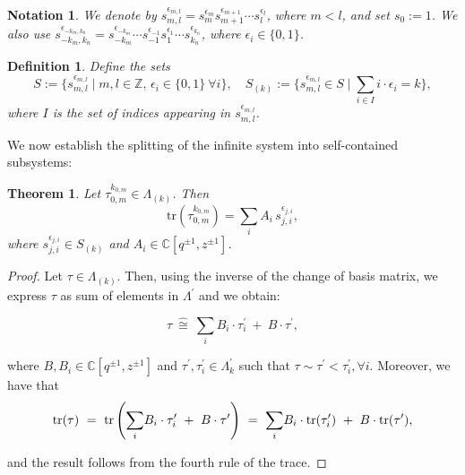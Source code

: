 \documentclass[11pt]{amsart}
\newtheorem{thm}{Theorem}
\newtheorem{defn}{Definition}
\newtheorem{nt}{Notation}
\begin{document}
\begin{nt}\rm
We denote by \(s_{m,l}^{\epsilon_{m,l}} = s_{m}^{\epsilon_m}s_{m+1}^{\epsilon_{m+1}}\cdots s_l^{\epsilon_l}\), where \(m<l\), and set \(s_0:=1\). We also use \(s_{-k_m,k_n}^{\epsilon_{-k_m,k_n}} = s_{-k_m}^{\epsilon_{-k_m}}\cdots s_{-1}^{\epsilon_{-1}} s_1^{\epsilon_1}\cdots s_{k_n}^{\epsilon_{k_n}}\), where \(\epsilon_i\in\{0,1\}\).
\end{nt}

\begin{defn}\rm \label{Ssets}
Define the sets
\[
S := \{ s_{m,l}^{\epsilon_{m,l}} \mid m,l\in\mathbb{Z},\, \epsilon_i\in\{0,1\} \ \forall i \}, \quad
S_{(k)} := \{ s_{m,l}^{\epsilon_{m,l}} \in S \mid \textstyle\sum_{i\in I}i\cdot\epsilon_i=k \},
\]
where \(I\) is the set of indices appearing in \(s_{m,l}^{\epsilon_{m,l}}\).
\end{defn}

We now establish the splitting of the infinite system into self-contained subsystems:

\begin{thm}\label{comb}
Let \(\tau_{0,m}^{k_{0,m}}\in \Lambda_{(k)}\). Then
\[
\mathrm{tr}(\tau_{0,m}^{k_{0,m}})=\sum_i A_i\,s_{j,i}^{\epsilon_{j,i}},
\]
where \(s_{j,i}^{\epsilon_{j,i}} \in S_{(k)}\) and \(A_i \in \mathbb{C}[q^{\pm1},z^{\pm1}]\).
\end{thm}

\begin{proof}

Let $\tau \in \Lambda_{(k)}$. Then, using the inverse of the change of basis matrix, we express $\tau$ as sum of elements in $\Lambda^{\prime}$ and we obtain:

\[
\tau \ \widehat{\cong}\ \underset{i}{\sum} {B_i\cdot \tau_i^{\prime}}\ +\ B\cdot \tau^{\prime},
\]

\noindent where $B, B_i\in \mathbb{C}[q^{\pm 1}, z^{\pm 1}]$ and $\tau^{\prime}, \tau_i^{\prime} \in \Lambda_k^{\prime}$ such that $\tau \sim \tau^{\prime} < \tau_i^{\prime}, \forall i$. Moreover, we have that
\smallbreak
$${\rm tr}(\tau)\ =\ {\rm tr}\left(\underset{i}{\sum} {B_i\cdot \tau_i^{\prime}}\ +\ B\cdot \tau^{\prime}\right)\ =\ \underset{i}{\sum} {B_i\cdot {\rm tr}(\tau_i^{\prime})}\ +\ B\cdot {\rm tr}(\tau^{\prime}),$$

\noindent and the result follows from the fourth rule of the trace.

\end{proof}
\end{document}
